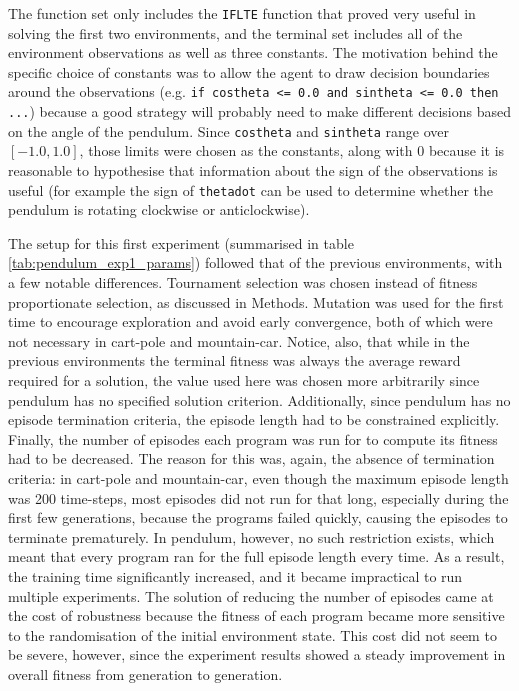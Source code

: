 The function set only includes the \verb+IFLTE+ function that proved very useful in solving the first two environments, and the terminal set includes all of the environment observations as well as three constants. The motivation behind the specific choice of constants was to allow the agent to draw decision boundaries around the observations (e.g. \verb+if costheta <= 0.0 and sintheta <= 0.0 then ...+) because a good strategy will probably need to make different decisions based on the angle of the pendulum. Since \verb+costheta+ and \verb+sintheta+ range over $[-1.0, 1.0]$, those limits were chosen as the constants, along with $0$ because it is reasonable to hypothesise that information about the sign of the observations is useful (for example the sign of \verb+thetadot+ can be used to determine whether the pendulum is rotating clockwise or anticlockwise).

The setup for this first experiment (summarised in table \ref{tab:pendulum_exp1_params}) followed that of the previous environments, with a few notable differences. Tournament selection was chosen instead of fitness proportionate selection, as discussed in Methods. Mutation was used for the first time to encourage exploration and avoid early convergence, both of which were not necessary in cart-pole and mountain-car. Notice, also, that while in the previous environments the terminal fitness was always the average reward required for a solution, the value used here was chosen more arbitrarily since pendulum has no specified solution criterion. Additionally, since pendulum has no episode termination criteria, the episode length had to be constrained explicitly. Finally, the number of episodes each program was run for to compute its fitness had to be decreased. The reason for this was, again, the absence of termination criteria: in cart-pole and mountain-car, even though the maximum episode length was 200 time-steps, most episodes did not run for that long, especially during the first few generations, because the programs failed quickly, causing the episodes to terminate prematurely. In pendulum, however, no such restriction exists, which meant that every program ran for the full episode length every time. As a result, the training time significantly increased, and it became impractical to run multiple experiments. The solution of reducing the number of episodes came at the cost of robustness because the fitness of each program became more sensitive to the randomisation of the initial environment state. This cost did not seem to be severe, however, since the experiment results showed a steady improvement in overall fitness from generation to generation. 

